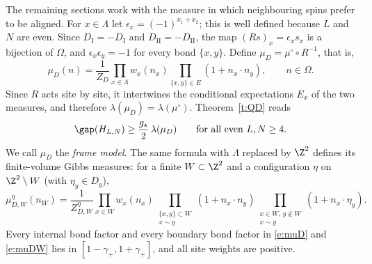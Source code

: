 The remaining sections work with the measure in which neighbouring spins prefer to be aligned. For $x \in \Lambda$ let $\epsilon_x = (-1)^{x_1 + x_2}$; this is well defined because $L$ and $N$ are even. Since $D_{\mathrm I} = -D_{\mathrm I}$ and $D_{\mathrm{II}} = -D_{\mathrm{II}}$, the map $(R s)_x = \epsilon_x s_x$ is a bijection of $\Omega$, and $\epsilon_x \epsilon_y = -1$ for every bond $\{x, y\}$. Define $\mu_D = \mu^\circ \circ R^{-1}$, that is,
\begin{equation}\label{e:muD}
\mu_D(n) = \frac{1}{Z_D} \prod_{x \in \Lambda} w_x(n_x) \prod_{\{x, y\} \in E} (1 + n_x \cdot n_y), \qquad n \in \Omega .
\end{equation}
Since $R$ acts site by site, it intertwines the conditional expectations $E_x$ of the two measures, and therefore $\lambda(\mu_D) = \lambda(\mu^\circ)$. Theorem~\ref{t:QD} reads
\begin{equation}\label{e:QDrot}
\gap(H_{L, N}) \ge \frac{g_\star}{2} \, \lambda(\mu_D) \qquad \text{for all even } L, N \ge 4 .
\end{equation}
We call $\mu_D$ the \emph{frame model}. The same formula with $\Lambda$ replaced by $\Z^2$ defines its finite-volume Gibbs measures: for a finite $W \subset \Z^2$ and a configuration $\eta$ on $\Z^2 \setminus W$ (with $\eta_y \in D_y$),
\begin{equation}\label{e:muDW}
\mu^{\eta}_{D, W}(n_W) = \frac{1}{Z^\eta_{D, W}} \prod_{x \in W} w_x(n_x) \prod_{\substack{\{x, y\} \subset W \\ x \sim y}} (1 + n_x \cdot n_y) \prod_{\substack{x \in W, \, y \notin W \\ x \sim y}} (1 + n_x \cdot \eta_y) .
\end{equation}
Every internal bond factor and every boundary bond factor in \eqref{e:muD} and \eqref{e:muDW} lies in $[1-\gamma_+,1+\gamma_+]$, and all site weights are positive.
